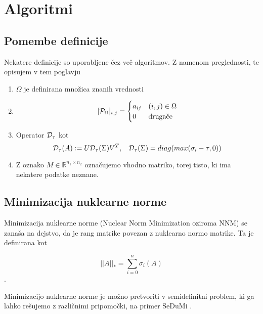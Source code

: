 \chapter{Algoritmi}

\section{Pomembe definicije}
Nekatere definicije so uporabljene čez več algoritmov. Z namenom preglednosti, te opisujem v tem poglavju
\begin{enumerate}
  \item $\Omega$ je definirana množica znanih vrednosti
  \item \[ [\mathcal{P}_\Omega]_{i,j} = \begin{cases}
            a_{ij} & (i, j) \in \Omega \\
            0      & \textrm{drugače}
          \end{cases}
        \]
  \item Operator $\mathcal{D}_\tau$ kot \[
            \mathcal{D}_\tau(A) := U \mathcal{D}_\tau(\Sigma) V^T, \hspace{0.3cm} \mathcal{D}_\tau(\Sigma) = diag(max(\sigma_i - \tau, 0))
        \] \cite{CCS}
  \item Z oznako $M \in \mathbb{R}^{n_1 \times n_2}$ označujemo vhodno matriko, torej tisto, ki ima nekatere podatke neznane. {\vspace{-10cm}\vspace{10cm}}
\end{enumerate}

\section{Minimizacija nuklearne norme}
Minimizacija nuklearne norme (Nuclear Norm Minimization oziroma NNM) se zanaša na dejstvo, da je rang matrike povezan z nuklearno normo matrike. Ta je definirana kot

\[
  ||A||_* = \sum_{i = 0}^{n} \sigma_i(A)
\].

Minimizacijo nuklearne norme je možno pretvoriti v semidefinitni problem, ki ga lahko rešujemo z različnimi pripomočki, na primer SeDuMi \cite{SeDuMi}.

